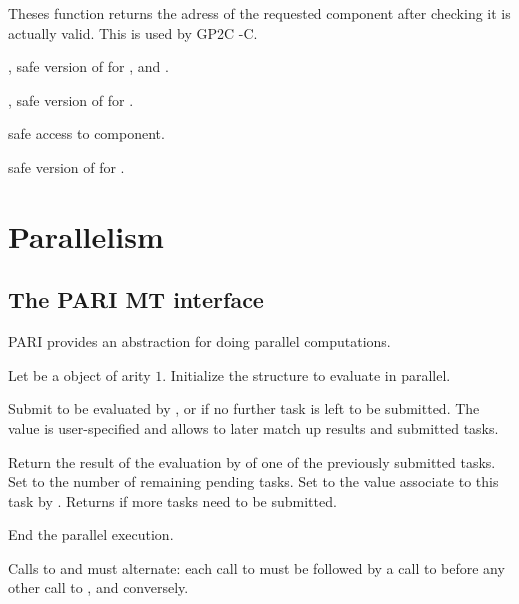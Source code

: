
Theses function returns the adress of the requested component after checking
it is actually valid. This is used by GP2C -C.

, safe version of  for ,
 and .

, safe version of  for .

 safe access to  component.

 safe version of
 for .

\chapter{Parallelism}

\section{The PARI MT interface}

PARI provides an abstraction for doing parallel computations.

 Let 
be a  object of arity $1$.  Initialize the structure 
to evaluate  in parallel.

 Submit
 to be evaluated by , or  if no further task
is left to be submitted. The value  is user-specified and allows
to later match up results and submitted tasks.

Return the result of the evaluation by  of one of the previously
submitted tasks. Set  to the number of remaining pending tasks.
Set  to the value associate to this task by
.  Returns  if more tasks need to be
submitted.

 End the parallel execution.

Calls to  and  must alternate: each
call to  must be followed by a call to
 before any other call to ,
and conversely.

